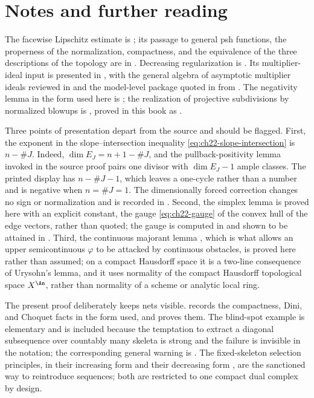 \section*{Notes and further reading}

The facewise Lipschitz estimate is \cite[Theorem~6.1]{BFJ16}; its passage to
general psh functions, the properness of the normalization, compactness, and
the equivalence of the three descriptions of the topology are in
\cite[Section~7]{BFJ16}.  Decreasing regularization is
\cite[Theorem~8.7]{BFJ16}.  Its multiplier-ideal input is presented in
, with the general algebra of asymptotic multiplier
ideals reviewed in  and the model-level package quoted in
 from \cite[Appendix~B]{BFJ16}.  The negativity
lemma in the form used here is \cite[Lemma~1.6]{BFJ16}; the realization of
projective subdivisions by normalized blowups is
\cite[Theorem~3.15]{BFJ16}, proved in this book as
.

Three points of presentation depart from the source and should be flagged.
First, the exponent in the slope--intersection inequality
\eqref{eq:ch22-slope-intersection} is $n-\#J$.  Indeed,
$\dim E_J=n+1-\#J$, and the pullback-positivity lemma invoked in the
source proof pairs one divisor with $\dim E_J-1$ ample classes.  The
printed display \cite[(6.3)]{BFJ16} has $n-\#J-1$, which leaves a
one-cycle rather than a number and is negative when $n=\#J=1$.  The
dimensionally forced correction changes no sign or normalization and is
recorded in .  Second, the simplex
lemma is proved here with an explicit constant, the gauge
\eqref{eq:ch22-gauge} of the convex hull of the edge vectors, rather than
quoted; the gauge is computed in
 and shown to be attained in
.  Third, the continuous majorant lemma
, which is what allows an upper
semicontinuous $\varphi$ to be attacked by continuous obstacles, is proved
here rather than assumed; on a compact Hausdorff space it is a two-line
consequence of Urysohn's lemma, and it uses normality of the compact Hausdorff
topological space
$X^{\An}$, rather than normality of a scheme or analytic local ring.

The present proof deliberately keeps nets visible.   records
the compactness, Dini, and Choquet facts in the form used, and
 proves them.  The blind-spot example
 is elementary and is included because
the temptation to extract a diagonal subsequence over countably many
skeleta is strong and the failure is invisible in the notation; the
corresponding general warning is
.  The fixed-skeleton selection
principles, in their increasing form
 and their decreasing form
, are the sanctioned way to
reintroduce sequences; both are restricted to one compact dual complex by
design.

